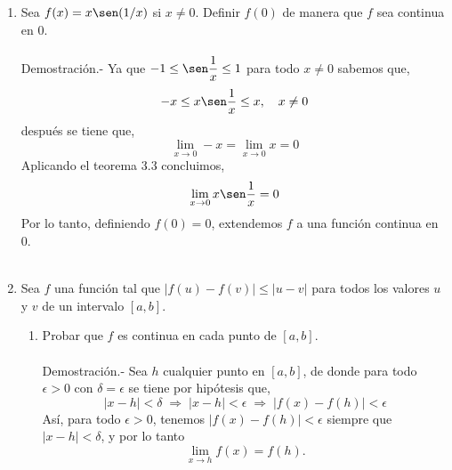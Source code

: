 \begin{enumerate}[\bfseries 1.]
    \item Sea $f(x)=x\sen (1/x)$ si $x\neq 0$. Definir $f(0)$ de manera que $f$ sea continua en $0$.\\\\
	Demostración.-\; Ya que $-1\leq \sen \dfrac{1}{x}\leq 1$ para todo $x\neq 0$ sabemos que,
	$$-x\leq x\sen\dfrac{1}{x}\leq x,\quad x\neq 0$$
	después se tiene que,
	$$\lim_{x\to 0}-x=\lim_{x\to 0}x=0$$
	Aplicando el teorema 3.3 concluimos,
	$$\lim_{x\to 0}x\sen\dfrac{1}{x}=0$$
	Por lo tanto, definiendo $f(0)=0$, extendemos $f$ a una función continua en $0$.\\\\

    \item Sea $f$ una función tal que $|f(u)-f(v)|\leq |u-v|$ para todos los valores $u$ y $v$ de un intervalo $[a,b]$.

	    \begin{center}
	    \end{center}
	    \vspace{.5cm}

	\begin{enumerate}[\bfseries a)]

	    \item Probar que $f$ es continua en cada punto de $[a,b]$.\\\\
		Demostración.-\; Sea $h$ cualquier punto en $[a,b]$, de donde para todo $\epsilon>0$ con $\delta=\epsilon$ se tiene por hipótesis que,
		$$|x-h|<\delta \;  \Longrightarrow \; |x-h|<\epsilon \; \Longrightarrow \; |f(x)-f(h)|<\epsilon$$
		Así, para todo $\epsilon>0$, tenemos $|f(x)-f(h)|<\epsilon$ siempre que $|x-h|<\delta$, y por lo tanto
		$$\lim_{x\to h}f(x)=f(h).$$\\\\



\end{enumerate}
\end{enumerate}
